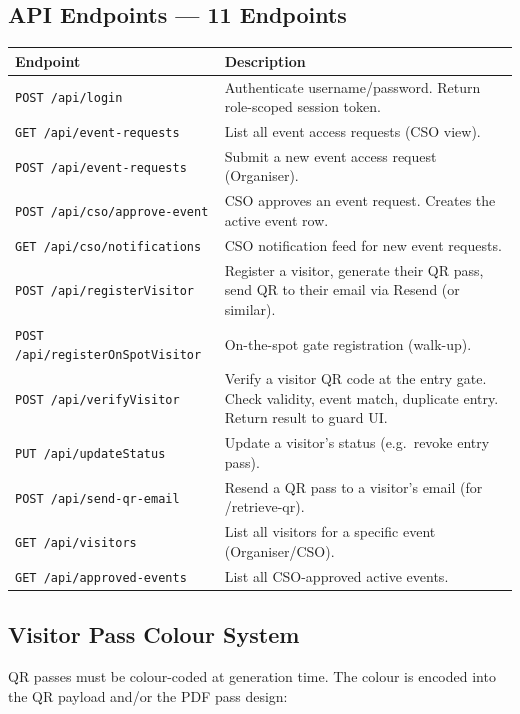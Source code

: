 \documentclass[12pt,a4paper]{article}
\begin{document}
\subsection{API Endpoints — 11 Endpoints}

\begin{tabularx}{\textwidth}{L{5cm} X}
\toprule
{}
\textbf{Endpoint} & \textbf{Description} \\
\midrule
\texttt{POST /api/login} & Authenticate username/password. Return role-scoped session token. \\
\texttt{GET /api/event-requests} & List all event access requests (CSO view). \\
\texttt{POST /api/event-requests} & Submit a new event access request (Organiser). \\
\texttt{POST /api/cso/approve-event} & CSO approves an event request. Creates the active event row. \\
\texttt{GET /api/cso/notifications} & CSO notification feed for new event requests. \\
\texttt{POST /api/registerVisitor} & Register a visitor, generate their QR pass, send QR to their email via Resend (or similar). \\
\texttt{POST /api/registerOnSpotVisitor} & On-the-spot gate registration (walk-up). \\
\texttt{POST /api/verifyVisitor} & Verify a visitor QR code at the entry gate. Check validity, event match, duplicate entry. Return result to guard UI. \\
\texttt{PUT /api/updateStatus} & Update a visitor's status (e.g.\ revoke entry pass). \\
\texttt{POST /api/send-qr-email} & Resend a QR pass to a visitor's email (for /retrieve-qr). \\
\texttt{GET /api/visitors} & List all visitors for a specific event (Organiser/CSO). \\
\texttt{GET /api/approved-events} & List all CSO-approved active events. \\
\bottomrule
\end{tabularx}

\subsection{Visitor Pass Colour System}

QR passes must be colour-coded at generation time. The colour is encoded into the QR payload and/or the PDF pass design:
\end{document}
